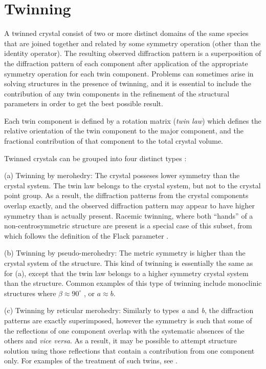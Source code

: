 \documentclass[pdf]{iucr}
\begin{document}
\section{Twinning}
\label{sec:ls_twinning}

A twinned crystal consist of two or more distinct domains of the same species that are joined together and related by some symmetry operation (other than the identity operator). The resulting observed diffraction pattern is a superposition of the diffraction pattern of each component after application of the appropriate symmetry operation for each twin component. Problems can sometimes arise in solving structures in the presence of twinning, and it is essential to include the contribution of any twin components in the refinement of the structural parameters in order to get the best possible result.

Each twin component is defined by a rotation matrix (\emph{twin law}) which defines the relative orientation of the twin component to the major component, and the fractional contribution of that component to the total crystal volume.

Twinned crystals can be grouped into four distinct types \cite{Herbst-Irmer:jz0004}:

(a) Twinning by merohedry: The crystal posseses lower symmetry than the crystal system. The twin law belongs to the crystal system, but not to the crystal point group. As a result, the diffraction patterns from the crystal components overlap exactly, and the observed diffraction pattern may appear to have higher symmetry than is actually present. Racemic twinning, where both ``hands'' of a non-centrosymmetric structure are present is a special case of this subset, from which follows the definition of the Flack parameter \cite{Flack:a22047}.

(b) Twinning by pseudo-merohedry: The metric symmetry is higher than the crystal system of the structure. This kind of twinning is essentially the same as for (a), except that the twin law belongs to a higher symmetry crystal system than the structure. Common examples of this type of twinning include monoclinic structures where $ \beta \approx 90^\circ $ , or $ a \approx b $.

(c) Twinning by reticular merohedry: Similarly to types \emph{a} and \emph{b}, the diffraction patterns are exactly superimposed, however the symmetry is such that some of the reflections of one component overlap with the systematic absences of the others and \emph{vice versa}. As a result, it may be possible to attempt structure solution using those reflections that contain a contribution from one component only. For examples of the treatment of such twins, see \cite{Herbst-Irmer:jz0014}.
\end{document}

